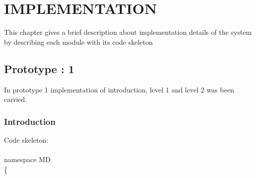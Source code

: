 \chapter{IMPLEMENTATION}

This chapter gives a brief description about implementation details of the
system by describing each module with its code skeleton

\section{Prototype : 1}
\hspace{1cm}In prototype 1 implementation of introduction,  level 1 and level 2 was been carried.
\subsection{Introduction}
\ttfamily \hspace{1cm}
Code skeleton:\\
\\

namespace MD\\
\{\\
    
